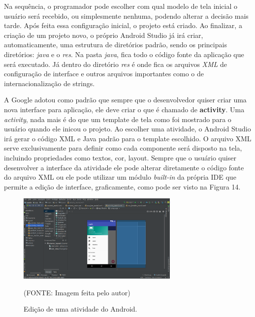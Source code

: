 \documentclass[
    12pt,       %
    openright,      %
    twoside,      %
    a4paper,      %
    english,      %
    french,       %
    spanish,      %
    brazil,       %
    ]{abntex2}
\begin{document}
        Na sequência, o programador pode escolher com qual modelo de tela inicial o usuário será
        recebido, ou simplesmente nenhuma, podendo alterar a decisão mais tarde. Após feita essa
        configuração inicial, o projeto está criado. Ao finalizar, a criação de um projeto novo,
        o próprio Android Studio já irá criar, automaticamente, uma estrutura de diretórios padrão,
        sendo os principais diretórios: \textit{java} e o \textit{res}. Na pasta \textit{java},
        fica todo o código fonte da aplicação que será executado. Já dentro do diretório
        \textit{res} é onde fica os arquivos \textit{XML} de configuração de interface e outros
        arquivos importantes como o de internacionalização de strings.

        A Google adotou como padrão que sempre que o desenvolvedor quiser criar uma nova interface
        para aplicação, ele deve criar o que é chamado de \textbf{activity}. Uma \textit{activity},
        nada mais é do que um template de tela como foi mostrado para o usuário quando ele inicou o
        projeto. Ao escolher uma atividade, o Android Studio irá gerar o código XML e Java padrão
        para o template escolhido. O arquivo XML serve exclusivamente para definir como cada
        componente será disposto na tela, incluindo propriedades como textos, cor, layout. Sempre
        que o usuário quiser desenvolver a interface da atividade ele pode alterar diretamente
        o código fonte do arquivo XML ou ele pode utilizar um módulo \textit{built-in} da própria
        IDE que permite a edição de interface, graficamente, como pode ser visto na Figura 14.

        \begin{figure}[htbp]
            \begin{center}
                \includegraphics[width=0.7\textwidth]{img/interfaceEditing.png}
            \end{center}
        \caption{\label{fig:passaro}Edição de uma atividade do Android.}
        \begin{center}(FONTE: Imagem feita pelo autor)\end{center}
        \end{figure}
\end{document}
